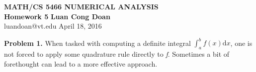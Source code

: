 \documentclass[14pt,a4paper]{article}
\begin{document}
\label{cover}
\begin{center}
	\vspace*{3cm}
	\large{\textbf{MATH/CS 5466 NUMERICAL ANALYSIS \\ Homework 5}}
	\vfill
	\textbf{Luan Cong Doan} \\ luandoan@vt.edu
	\vfill
	April 18, 2016
\end{center}
\pagebreak

\label{Answer Sheet - Numerical Homework 5}
\doublespacing

\label{Problem 1}
\large\textbf{Problem 1.} When tasked with computing a definite integral $\int_{a}^{b}f(x)\mathrm{d}x$, one is not forced to apply some quadrature rule directly to \textit{f}. Sometimes a bit of forethought can lead to a more effective approach.
\end{document}
